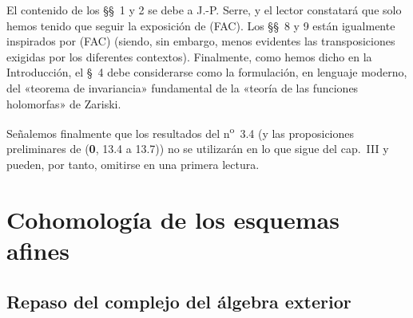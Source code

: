 \documentclass[10pt,oneside,openany]{book}
\theoremstyle{egaenv}\newtheorem*{env}{---}
\theoremstyle{egastatement}
\theoremstyle{egadescription}
\newcommand{\oldpage}[2][]{\marginnote{\normalfont\scriptsize\textbf{#1}\,|\,#2}\ignorespaces}
\begin{document}

\oldpage[III]{82}
El contenido de los \S\S~1 y 2 se debe a J.-P. Serre, y el lector constatará que solo hemos tenido que seguir la exposición de (FAC). Los \S\S~8 y 9 están igualmente inspirados por (FAC) (siendo, sin embargo, menos evidentes las transposiciones exigidas por los diferentes contextos). Finalmente, como hemos dicho en la Introducción, el \S~4 debe considerarse como la formulación, en lenguaje moderno, del «teorema de invariancia» fundamental de la «teoría de las funciones holomorfas» de Zariski.

Señalemos finalmente que los resultados del n\textsuperscript{o}~3.4 (y las proposiciones preliminares de (\textbf{0}, 13.4 a 13.7)) no se utilizarán en lo que sigue del cap.~III y pueden, por tanto, omitirse en una primera lectura.

\setcounter{section}{0}


\section{Cohomología de los esquemas afines}
\label{section:III.1}
\label{section:III.1-fr}

\subsection{Repaso del complejo del álgebra exterior}
\label{subsection:III.1.1}
\label{subsection:III.1.1-fr}
\end{document}
